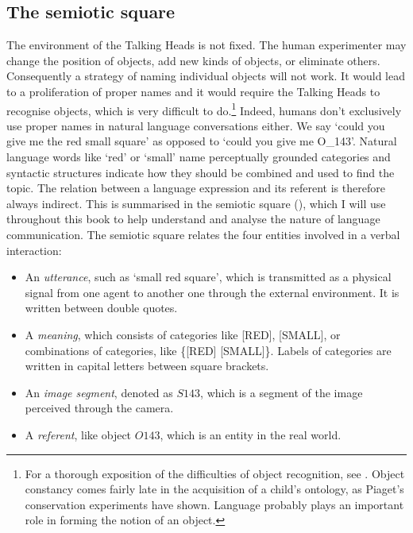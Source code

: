 \subsection{The semiotic square}

The environment of the Talking Heads is 
not fixed. The human experimenter 
may change the position of objects, add new kinds of 
objects, or eliminate
others. Consequently a strategy of naming individual objects
will not work. It would lead to a proliferation of 
proper names and it would require the Talking Heads to
recognise objects, which is very difficult to do.\footnote{
For a thorough exposition of the difficulties of 
object recognition, see \cite{Ullman:1996}. 
Object constancy comes fairly late in the 
acquisition of a child's ontology, as Piaget's conservation
experiments have shown. Language probably plays an important
role in forming the notion of an object.}
Indeed, humans don't exclusively use proper names in 
natural language conversations 
either. We say `could you give me the red small square' as 
opposed to `could you give me O\_143'. Natural language 
words like `red' or `small' name perceptually grounded categories
and syntactic structures indicate how they should
be combined and used to find the topic. The relation between 
a language expression and its referent is therefore 
always indirect. This is summarised
in the semiotic square (), which I will use throughout this book to 
help understand and analyse the nature of language communication. 
The semiotic square relates the four entities
involved in a verbal interaction: 
\begin{itemize}
\item An {\itshape utterance}, such as `small red square', which is 
transmitted as a physical 
signal from one agent to another one through the 
external environment. It is written between double quotes. 
\item A {\itshape meaning}, which consists of categories like [RED], [SMALL], 
or combinations of categories, like \{[RED] [SMALL]\}. Labels of 
categories are written in capital letters between 
square brackets. 
\item An {\itshape image segment}, denoted as $S143$, which is 
a segment of the image perceived through the camera.
\item A {\itshape referent}, like object $O143$, which is 
an entity in the real world. 
\end{itemize}


